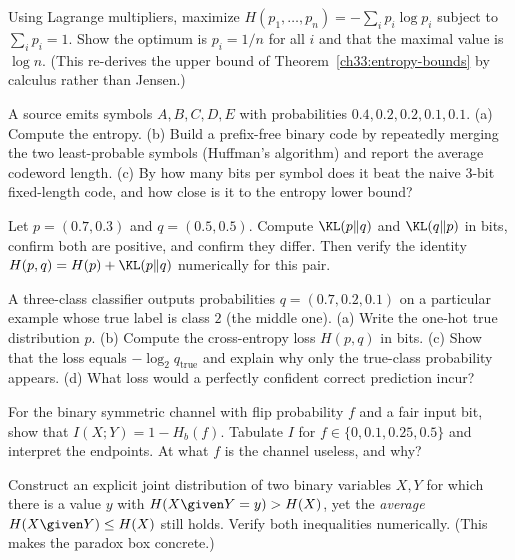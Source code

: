 \begin{exercise}
\label{ch33:ex-max-uniform}
Using Lagrange multipliers, maximize $H(p_1,\dots,p_n) = -\sum_i p_i\log p_i$ subject to $\sum_i p_i = 1$.
Show the optimum is $p_i = 1/n$ for all $i$ and that the maximal value is $\log n$. (This re-derives the
upper bound of Theorem~\ref{ch33:entropy-bounds} by calculus rather than Jensen.)
\end{exercise}

\begin{exercise}
\label{ch33:ex-huffman}
A source emits symbols $A,B,C,D,E$ with probabilities $0.4, 0.2, 0.2, 0.1, 0.1$. (a) Compute the entropy.
(b) Build a prefix-free binary code by repeatedly merging the two least-probable symbols (Huffman's
algorithm) and report the average codeword length. (c) By how many bits per symbol does it beat the naive
$3$-bit fixed-length code, and how close is it to the entropy lower bound?
\end{exercise}

\begin{exercise}
\label{ch33:ex-kl-asym}
Let $p = (0.7, 0.3)$ and $q = (0.5, 0.5)$. Compute $\KL(p\|q)$ and $\KL(q\|p)$ in bits, confirm both are
positive, and confirm they differ. Then verify the identity $H(p,q) = H(p) + \KL(p\|q)$ numerically for
this pair.
\end{exercise}

\begin{exercise}
\label{ch33:ex-crossent-loss}
A three-class classifier outputs probabilities $q = (0.7, 0.2, 0.1)$ on a particular example whose true
label is class $2$ (the middle one). (a) Write the one-hot true distribution $p$. (b) Compute the
cross-entropy loss $H(p,q)$ in bits. (c) Show that the loss equals $-\log_2 q_{\text{true}}$ and explain
why only the true-class probability appears. (d) What loss would a perfectly confident correct prediction
incur?
\end{exercise}

\begin{exercise}
\label{ch33:ex-bsc}
For the binary symmetric channel with flip probability $f$ and a fair input bit, show that $I(X;Y) = 1 -
H_b(f)$. Tabulate $I$ for $f \in \{0, 0.1, 0.25, 0.5\}$ and interpret the endpoints. At what $f$
is the channel useless, and why?
\end{exercise}

\begin{exercise}
\label{ch33:ex-conditioning}
Construct an explicit joint distribution of two binary variables $X,Y$ for which there is a value $y$ with
$H(X\given Y=y) > H(X)$, yet the \emph{average} $H(X\given Y) \le H(X)$ still holds. Verify both
inequalities numerically. (This makes the paradox box concrete.)
\end{exercise}

